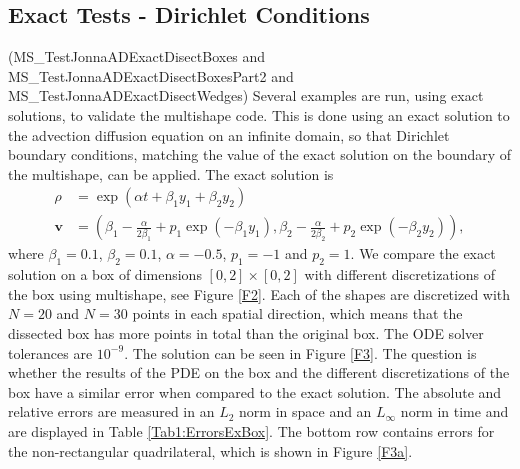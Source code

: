 \documentclass[11pt, a4paper]{article}
\theoremstyle{definition}
\begin{document}
\subsection{Exact Tests - Dirichlet Conditions}
(MS\_TestJonnaADExactDisectBoxes and MS\_TestJonnaADExactDisectBoxesPart2 and MS\_TestJonnaADExactDisectWedges)
Several examples are run, using exact solutions, to validate the multishape code. This is done using an exact solution to the advection diffusion equation on an infinite domain, so that Dirichlet boundary conditions, matching the value of the exact solution on the boundary of the multishape, can be applied.
The exact solution is \cite{Hutomo_2019}
\begin{align*}
	\rho &= \exp(\alpha t + \beta_1 y_1 + \beta_2 y_2)\\
	\mathbf v &= \left(\beta_1 - \frac{\alpha}{2 \beta_1} + p_1\exp(-\beta_1 y_1) , \beta_2 - \frac{\alpha}{2 \beta_2} + p_2\exp(-\beta_2 y_2) \right),
\end{align*}
where $\beta_1 = 0.1$, $\beta_2 = 0.1$, $\alpha = -0.5$, $p_1 = -1$ and $p_2 = 1$.
We compare the exact solution on a box of dimensions $[0,2] \times [0,2] $ with different discretizations of the box using multishape, see Figure \ref{F2}. Each of the shapes are discretized with $N = 20$ and $N = 30$ points in each spatial direction, which means that the dissected box has more points in total than the original box. The ODE solver tolerances are $10^{-9}$. The solution can be seen in Figure \ref{F3}. The question is whether the results of the PDE on the box and the different discretizations of the box have a similar error when compared to the exact solution. The absolute and relative errors are measured in an $L_2$ norm in space and an $L_\infty$ norm in time and are displayed in Table \ref{Tab1:ErrorsExBox}. The bottom row contains errors for the non-rectangular quadrilateral, which is shown in Figure \ref{F3a}. 
\end{document}
